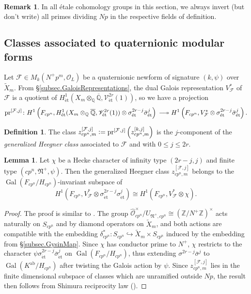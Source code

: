 \documentclass[a4paper]{amsart}
\numberwithin{equation}{section}
\theoremstyle{definition}
\newtheorem{lemma}[theorem]{Lemma}
\newtheorem{definition}[theorem]{Definition}
\newtheorem{remark}[theorem]{Remark}
\newcommand{\Q}{\mathbb{Q}}
\newcommand{\Z}{\mathbb{Z}}
\newcommand{\defeq}{\vcentcolon=}
\DeclareMathOperator{\Gal}{Gal}
\DeclareMathOperator{\et}{\text{\'et}}
\renewcommand{\et}{\mathrm{\acute{e}t}}
\newcommand{\longepi}{\mbox{\;$\relbar\joinrel\twoheadrightarrow$\;}}
\begin{document}
\begin{remark}\label{rem.InvertPrimes}
In all étale cohomology groups in this section, we always invert (but don't write) all primes dividing $Np$ in the respective fields of definition.
\end{remark}

\subsection{Classes associated to quaternionic modular forms}\label{subsec.ClassesModularForms}

Let $\mathcal{F}\in M_k(N^+p^m,\mathcal{O}_L)$ be a quaternionic newform of signature $(k,\psi)$ over $\widetilde{X}_m$. From \S\ref{subsec.GaloisRepresentations}, the dual Galois representation $V_\mathcal{F}^*$ of $\mathcal{F}$ is a quotient of $H^1_{\et}({X}_m\otimes_\Q\overline{\Q},\mathscr{V}^{2r}_{\et}(1))$, so we have a projection
\begin{equation}\label{eq.ProjectionMF1}
\mathrm{pr}^{[\mathcal{F},j]}\colon H^1\left(F_{cp^n},H^1_{\et}({X}_m\otimes_\Q\overline{\Q},\mathscr{V}^{2r}_{\et}(1))\otimes\sigma^{2r-j}_{\et}\bar{\sigma}_{\et}^j\right)\longepi\\ H^1\left(F_{cp^n},V_\mathcal{F}^*\otimes\sigma_{\et}^{2r-j}\bar\sigma^j_{\et}\right).
\end{equation}

\begin{definition}
The class $z_{cp^n,m}^{[\mathcal{F},j]}\defeq\mathrm{pr}^{[\mathcal{F},j]}\left(z^{[k,j]}_{cp^n,m}\right)$ is the $j$-component of the \emph{generalized Heegner class} associated to $\mathcal{F}$ and with $0\leq j\leq 2r$.
\end{definition}

\begin{lemma}\label{lem.Shimura}
Let $\chi$ be a Hecke character of infinity type $(2r-j,j)$ and finite type $(cp^n,\mathfrak{N}^+,\psi)$. Then the generalized Heegner class $z_{cp^n,m}^{[\mathcal{F},j]}$ belongs to the $\Gal(F_{cp^n}/H_{cp^n})$-invariant subspace of \[H^1(F_{cp^n},V^\ast_\mathcal{F}\otimes\sigma_{\et}^{2r-j}\sigma^j_{\et})\cong H^1(F_{cp^n},V_\mathcal{F}^\ast\otimes\chi).\]
\end{lemma}
\begin{proof}
The proof is similar to \cite[Proposition 3.5.2]{JetchevLoefflerZerbes}. The group $\widehat{\mathcal{O}}_{cp^n}^\times/U_{\mathfrak{N}^+,cp^n}\cong(\Z/N^+\Z)^\times$ acts naturally on $S_{cp^n}$ and by diamond operators on $\widetilde{X}_m$, and both actions are compatible with the embedding $\delta_{cp^n}^*\colon S_{cp^n}\hookrightarrow \widetilde{X}_m\times S_{cp^n}$ induced by the embedding from \S\ref{subsec.GysinMap}. Since $\chi$ has conductor prime to $N^+$, $\chi$ restricts to the character $\psi\sigma^{2r-j}_{\et}\bar\sigma^{j}_{\et}$ on $\Gal(F_{cp^n}/H_{cp^n})$, thus extending $\sigma^{2r-j}\bar\sigma^{j}$ to $\Gal(K^\mathrm{ab}/ H_{cp^n})$ after twisting the Galois action by $\psi$. Since $z_{cp^n,m}^{[\mathcal{F},j]}$ lies in the 
finite dimensional subspace of classes which are unramified outside $Np$, the result then follows from Shimura reciprocity law (\cite[Theorem 9.6]{Shimura}).
\end{proof}
 
\end{document}
